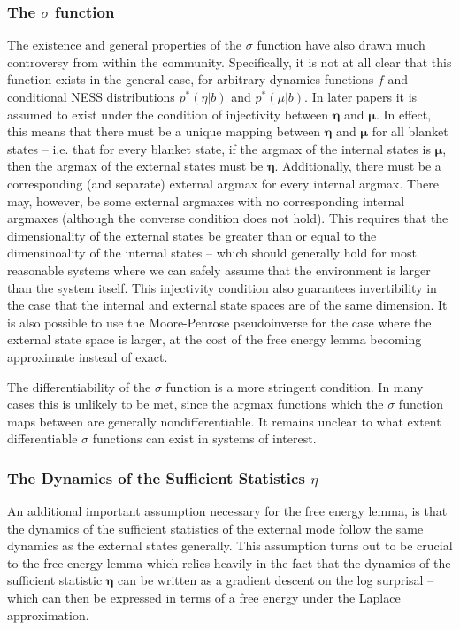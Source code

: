 \subsubsection{The $\sigma$ function}

The existence and general properties of the $\sigma$ function have also drawn much controversy from within the community. Specifically, it is not at all clear that this function exists in the general case, for arbitrary dynamics functions $f$ and conditional NESS distributions $p^*(\eta | b)$ and $p^*(\mu | b)$. In later papers it is assumed to exist under the condition of injectivity between $\bm{\eta}$ and $\bm{\mu}$. In effect, this means that there must be a unique mapping between $\bm{\eta}$ and $\bm{\mu}$ for all blanket states -- i.e. that for every blanket state, if the argmax of the internal states is $\bm{\mu}$, then the argmax of the external states must be $\bm{\eta}$. Additionally, there must be a corresponding (and separate) external argmax for every internal argmax. There may, however, be some external argmaxes with no corresponding internal argmaxes (although the converse condition does not hold). This requires that the dimensionality of the external states be greater than or equal to the dimensinoality of the internal states -- which should generally hold for most reasonable systems where we can safely assume that the environment is larger than the system itself. This injectivity condition also guarantees invertibility in the case that the internal and external state spaces are of the same dimension. It is also possible to use the Moore-Penrose pseudoinverse for the case where the external state space is larger, at the cost of the free energy lemma becoming approximate instead of exact.

The differentiability of the $\sigma$ function is a more stringent condition. In many cases this is unlikely to be met, since the argmax functions which the $\sigma$ function maps between are generally nondifferentiable. It remains unclear to what extent differentiable $\sigma$ functions can exist in systems of interest.
\subsubsection{The Dynamics of the Sufficient Statistics $\eta$}

An additional important assumption necessary for the free energy lemma, is that the dynamics of the sufficient statistics of the external mode follow the same dynamics as the external states generally. This assumption turns out to be crucial to the free energy lemma which relies heavily in the fact that the dynamics of the sufficient statistic $\bm{\eta}$ can be written as a gradient descent on the log surprisal -- which can then be expressed in terms of a free energy under the Laplace approximation.

